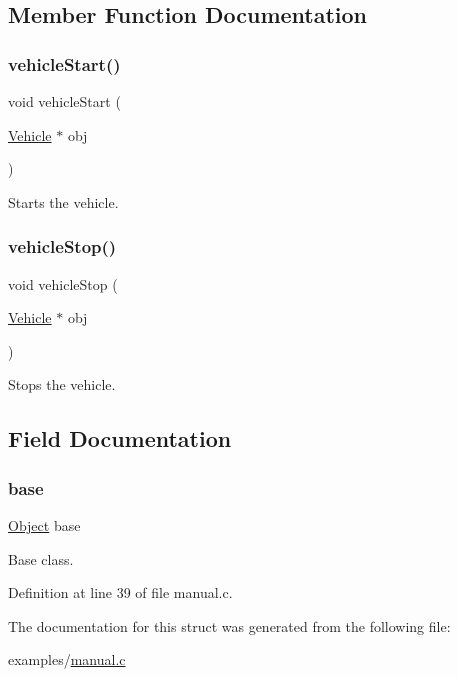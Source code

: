 \subsection{Member Function Documentation}
\mbox{\label{struct_vehicle_a6891d3d28853bc3fdd075596dc6de9f8}} 
\subsubsection{\texorpdfstring{vehicle\+Start()}{vehicleStart()}}
{\footnotesize\ttfamily void vehicle\+Start (\begin{DoxyParamCaption}\item[{\hyperlink{struct_vehicle}{Vehicle} $\ast$}]{obj }\end{DoxyParamCaption})}

Starts the vehicle. \mbox{\label{struct_vehicle_a4dcbcba43792dcd673a552b14479ab77}} 
\subsubsection{\texorpdfstring{vehicle\+Stop()}{vehicleStop()}}
{\footnotesize\ttfamily void vehicle\+Stop (\begin{DoxyParamCaption}\item[{\hyperlink{struct_vehicle}{Vehicle} $\ast$}]{obj }\end{DoxyParamCaption})}

Stops the vehicle. 

\subsection{Field Documentation}
\mbox{\label{struct_vehicle_a23cf4ef56ba22bed625eab08d6361fa7}} 
\subsubsection{\texorpdfstring{base}{base}}
{\footnotesize\ttfamily \hyperlink{struct_object}{Object} base\hspace{0.3cm}{\ttfamily [protected]}}



Base class. 



Definition at line 39 of file manual.\+c.



The documentation for this struct was generated from the following file\+:\begin{DoxyCompactItemize}
\item 
examples/\hyperlink{manual_8c}{manual.\+c}\end{DoxyCompactItemize}
